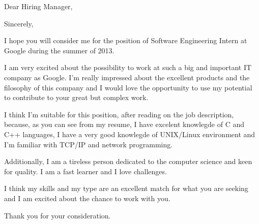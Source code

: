 \documentclass[11pt,a4paper,sans]{moderncv}
\begin{document}
\date{October 21, 2012}
\opening{Dear Hiring Manager,}
\closing{Sincerely,}
\makelettertitle

I hope you will consider me for the position of Software Engineering
Intern at Google during the summer of 2013.

I am very excited about the possibility to work at such a big and
important IT company as Google. I'm really impressed about the excellent products
and the filosophy of this company and I would love the opportunity to
use my potential to contribute to your great but complex work.

I think I'm suitable for this position, after reading on the job
description, because, as you can see from my resume, I have excelent knowlegde
of C and C++ languages, I have a very good knowlegde of UNIX/Linux environment 
and I'm familiar with TCP/IP and network programming.

Additionally, I am a tireless person dedicated to the computer science
and keen for quality. I am a fast learner and I love challenges.

I think my skills and my type are an excellent match for what you are
seeking and I am excited about the chance to work with you.

Thank you for your consideration.

\makeletterclosing
\end{document}
